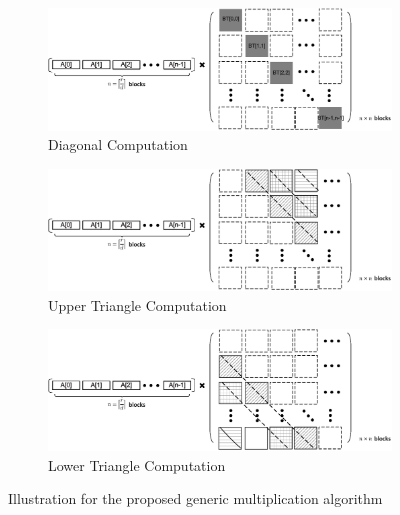\documentclass[runningheads]{llncs}
\begin{document}

\begin{figure}[!tb]
\centering
\begin{subfigure}[t]{0.47\textwidth}\centering
\includegraphics[width=\textwidth]{./fig/generic_mul_illustrate.eps}
\caption{Diagonal Computation}
\label{fig:gmul_ill1}
\end{subfigure}
\hspace{1em}
\begin{subfigure}[t]{0.47\textwidth}\centering
\includegraphics[width=\textwidth]{./fig/generic_mul_illustrate2.eps}
\caption{Upper Triangle Computation}
\label{fig:gmul_ill2}
\end{subfigure}
\hspace{1em}
\begin{subfigure}[t]{0.47\textwidth}\centering
\includegraphics[width=\textwidth]{./fig/generic_mul_illustrate3.eps}
\caption{Lower Triangle Computation}
\label{fig:gmul_ill3}
\end{subfigure}
\caption{Illustration for the proposed generic multiplication algorithm}
\end{figure}
\end{document}
